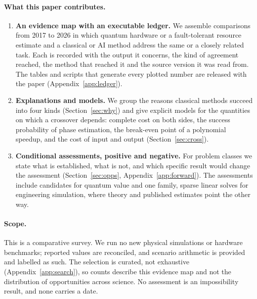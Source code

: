 \documentclass[10pt,a4paper]{article}
\begin{document}
\paragraph{What this paper contributes.}
\begin{enumerate}[leftmargin=*]
\item \textbf{An evidence map with an executable ledger.} We assemble \nEntries{} comparisons from 2017 to 2026 in which quantum hardware or a fault-tolerant resource estimate and a classical or AI method address the same or a closely related task. Each is recorded with the output it concerns, the kind of agreement reached, the method that reached it and the source version it was read from. The tables and scripts that generate every plotted number are released with the paper (Appendix~\ref{app:ledger}).
\item \textbf{Explanations and models.} We group the reasons classical methods succeed into four kinds (Section~\ref{sec:why}) and give explicit models for the quantities on which a crossover depends: complete cost on both sides, the success probability of phase estimation, the break-even point of a polynomial speedup, and the cost of input and output (Section~\ref{sec:cross}).
\item \textbf{Conditional assessments, positive and negative.} For \nClasses{} problem classes we state what is established, what is not, and which specific result would change the assessment (Section~\ref{sec:opps}, Appendix~\ref{app:forward}). The assessments include candidates for quantum value and one family, sparse linear solves for engineering simulation, where theory and published estimates point the other way.
\end{enumerate}

\paragraph{Scope.} This is a comparative survey. We run no new physical simulations or hardware benchmarks; reported values are reconciled, and scenario arithmetic is provided and labelled as such. The selection is curated, not exhaustive (Appendix~\ref{app:search}), so counts describe this evidence map and not the distribution of opportunities across science. No assessment is an impossibility result, and none carries a date.
\end{document}
